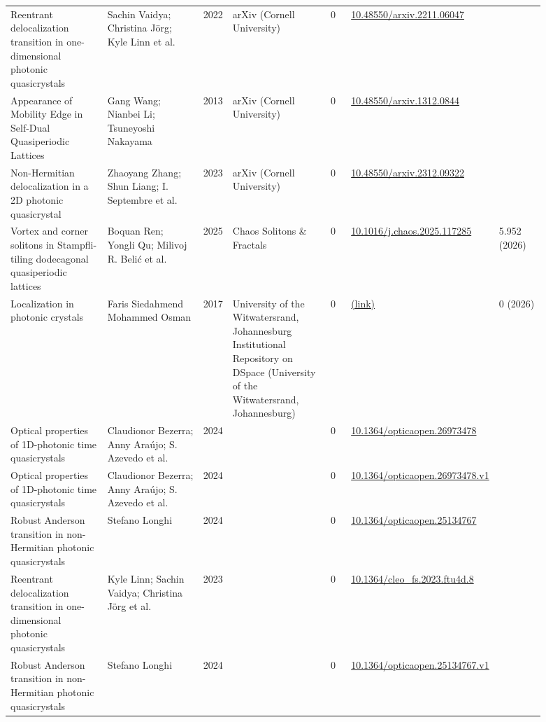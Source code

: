 \documentclass[10pt,a4paper]{article}
\begin{document}
{\begin{longtable}{p{0.192\linewidth}p{0.192\linewidth}p{0.043\linewidth}p{0.192\linewidth}p{0.043\linewidth}p{0.132\linewidth}p{0.096\linewidth}}
Reentrant delocalization transition in one-dimensional photonic quasicrystals & Sachin Vaidya; Christina Jörg; Kyle Linn et al. & 2022 & arXiv (Cornell University) & 0 & \href{https://doi.org/10.48550/arxiv.2211.06047}{10.48550/arxiv.2211.06047} &  \\
Appearance of Mobility Edge in Self-Dual Quasiperiodic Lattices & Gang Wang; Nianbei Li; Tsuneyoshi Nakayama & 2013 & arXiv (Cornell University) & 0 & \href{https://doi.org/10.48550/arxiv.1312.0844}{10.48550/arxiv.1312.0844} &  \\
Non-Hermitian delocalization in a 2D photonic quasicrystal & Zhaoyang Zhang; Shun Liang; I. Septembre et al. & 2023 & arXiv (Cornell University) & 0 & \href{https://doi.org/10.48550/arxiv.2312.09322}{10.48550/arxiv.2312.09322} &  \\
Vortex and corner solitons in Stampfli-tiling dodecagonal quasiperiodic lattices & Boquan Ren; Yongli Qu; Milivoj R. Belić et al. & 2025 & Chaos Solitons \& Fractals & 0 & \href{https://doi.org/10.1016/j.chaos.2025.117285}{10.1016/j.chaos.2025.117285} & 5.952 (2026) \\
Localization in photonic crystals & Faris Siedahmend Mohammed Osman & 2017 & University of the Witwatersrand, Johannesburg Institutional Repository on DSpace (University of the Witwatersrand, Johannesburg) & 0 & \href{https://openalex.org/W2794744957}{(link)} & 0 (2026) \\
Optical properties of 1D-photonic time quasicrystals & Claudionor Bezerra; Anny Araújo; S. Azevedo et al. & 2024 &  & 0 & \href{https://doi.org/10.1364/opticaopen.26973478}{10.1364/opticaopen.26973478} &  \\
Optical properties of 1D-photonic time quasicrystals & Claudionor Bezerra; Anny Araújo; S. Azevedo et al. & 2024 &  & 0 & \href{https://doi.org/10.1364/opticaopen.26973478.v1}{10.1364/opticaopen.26973478.v1} &  \\
Robust Anderson transition in non-Hermitian photonic quasicrystals & Stefano Longhi & 2024 &  & 0 & \href{https://doi.org/10.1364/opticaopen.25134767}{10.1364/opticaopen.25134767} &  \\
Reentrant delocalization transition in one-dimensional photonic quasicrystals & Kyle Linn; Sachin Vaidya; Christina Jörg et al. & 2023 &  & 0 & \href{https://doi.org/10.1364/cleo_fs.2023.ftu4d.8}{10.1364/cleo\_fs.2023.ftu4d.8} &  \\
Robust Anderson transition in non-Hermitian photonic quasicrystals & Stefano Longhi & 2024 &  & 0 & \href{https://doi.org/10.1364/opticaopen.25134767.v1}{10.1364/opticaopen.25134767.v1} &  \\

\end{longtable}}
\end{document}
